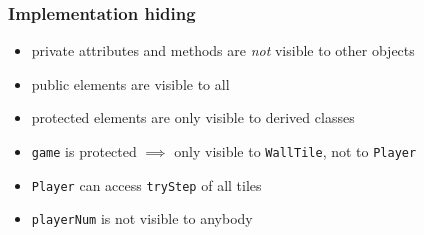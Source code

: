 \documentclass{slides}
\begin{document}
\begin{frame}
  \frametitle{Implementation hiding}
  \begin{center}
  \end{center}

  \begin{itemize}
  \item \alert{private} attributes and methods are \emph{not} visible to
    other objects
  \item \alert{public} elements are visible to all
  \item \alert{protected} elements are only visible to derived classes
  \item \texttt{game} is \alert{protected} $\implies$ only visible to
    \texttt{WallTile}, not to \texttt{Player}
  \item \texttt{Player} can access \texttt{tryStep} of all tiles
  \item \texttt{playerNum} is not visible to anybody
  \end{itemize}
\end{frame}
\end{document}
